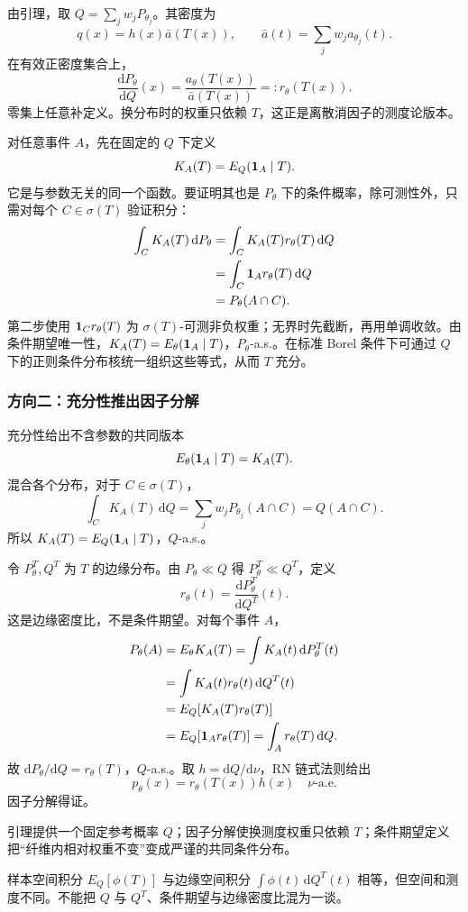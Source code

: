 由引理，取 $Q=\sum_jw_jP_{\theta_j}$。其密度为
\[
 q(x)=h(x)\bar a(T(x)),\qquad
 \bar a(t)=\sum_jw_ja_{\theta_j}(t).
\]
在有效正密度集合上，
\[
 \frac{\mathrm dP_\theta}{\mathrm dQ}(x)
 =\frac{a_\theta(T(x))}{\bar a(T(x))}
 =:r_\theta(T(x)).
\]
零集上任意补定义。换分布时的权重只依赖 $T$，这正是离散消因子的测度论版本。

对任意事件 $A$，先在固定的 $Q$ 下定义
\[
 K_A(T)=E_Q(\mathbf 1_A\mid T).
\]
它是与参数无关的同一个函数。要证明其也是 $P_\theta$ 下的条件概率，除可测性外，只需对每个 $C\in\sigma(T)$ 验证积分：
\[
 \begin{aligned}
 \int_CK_A(T)\,\mathrm dP_\theta
 &=\int_CK_A(T)r_\theta(T)\,\mathrm dQ\\
 &=\int_C\mathbf 1_A r_\theta(T)\,\mathrm dQ\\
 &=P_\theta(A\cap C).
 \end{aligned}
\]
第二步使用 $\mathbf 1_Cr_\theta(T)$ 为 $\sigma(T)$-可测非负权重；无界时先截断，再用单调收敛。由条件期望唯一性，$K_A(T)=E_\theta(\mathbf 1_A\mid T)$，$P_\theta$-a.s.。在标准 Borel 条件下可通过 $Q$ 下的正则条件分布核统一组织这些等式，从而 $T$ 充分。

\subsubsection{方向二：充分性推出因子分解}
充分性给出不含参数的共同版本
\[
 E_\theta(\mathbf 1_A\mid T)=K_A(T).
\]
混合各个分布，对于 $C\in\sigma(T)$，
\[
 \int_CK_A(T)\,\mathrm dQ
 =\sum_jw_jP_{\theta_j}(A\cap C)=Q(A\cap C).
\]
所以 $K_A(T)=E_Q(\mathbf 1_A\mid T)$，$Q$-a.s.。

令 $P_\theta^T,Q^T$ 为 $T$ 的边缘分布。由 $P_\theta\ll Q$ 得 $P_\theta^T\ll Q^T$，定义
\[
 r_\theta(t)=\frac{\mathrm dP_\theta^T}{\mathrm dQ^T}(t).
\]
这是边缘密度比，不是条件期望。对每个事件 $A$，
\[
 \begin{aligned}
 P_\theta(A)
 &=E_\theta K_A(T)
 =\int K_A(t)\,\mathrm dP_\theta^T(t)\\
 &=\int K_A(t)r_\theta(t)\,\mathrm dQ^T(t)\\
 &=E_Q[K_A(T)r_\theta(T)]\\
 &=E_Q[\mathbf 1_A r_\theta(T)]
 =\int_A r_\theta(T)\,\mathrm dQ.
 \end{aligned}
\]
故 $\mathrm dP_\theta/\mathrm dQ=r_\theta(T)$，$Q$-a.s.。取 $h=\mathrm dQ/\mathrm d\nu$，RN 链式法则给出
\[
 p_\theta(x)=r_\theta(T(x))h(x)\quad\nu\text{-a.e.}
\]
因子分解得证。

\begin{notebox}[证明中各测度的作用]
引理提供一个固定参考概率 $Q$；因子分解使换测度权重只依赖 $T$；条件期望定义把“纤维内相对权重不变”变成严谨的共同条件分布。

样本空间积分 $E_Q[\phi(T)]$ 与边缘空间积分 $\int\phi(t)\,\mathrm dQ^T(t)$ 相等，但空间和测度不同。不能把 $Q$ 与 $Q^T$、条件期望与边缘密度比混为一谈。
\end{notebox}

